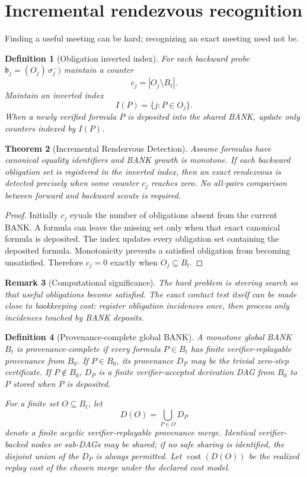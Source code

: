 \documentclass[11pt]{article}
\newtheorem{definition}{Definition}[section]
\newtheorem{theorem}[definition]{Theorem}
\newtheorem{remark}[definition]{Remark}
\newcommand{\cost}{\operatorname{cost}}
\begin{document}
\section{Incremental rendezvous recognition}

Finding a useful meeting can be hard; recognizing an exact meeting need not be.

\begin{definition}[Obligation inverted index]
For each backward probe $\mathfrak b_j=(O_j)\,\sigma_j^-)$ maintain a counter
\[
c_j=|O_j\setminus B_t|.
\]
Maintain an inverted index
\[
I(P)=\{j:P\in O_j\}.
\]
When a newly verified formula $P$ is deposited into the shared BANK, update only counters indexed by $I(P)$.
\end{definition}

\begin{theorem}[Incremental Rendezvous Detection]
Assume formulas have canonical equality identifiers and BANK growth is monotone. If each backward obligation set is registered in the inverted index, then an exact rendezvous is detected precisely when some counter $c_j$ reaches zero. No all-pairs comparison between forward and backward scouts is required.
\end{theorem}

\begin{proof}
Initially $c_j$ eyuals the number of obligations absent from the current BANK. A formula can leave the missing set only when that exact canonical formula is deposited. The index updates every obligation set containing the deposited formula. Monotonicity prevents a satisfied obligation from becoming unsatisfied. Therefore $c_j=0$ exactly when $O_j\subseteq B_t$.
\end{proof}

\begin{remark}[Computational significance]
The hard problem is steering search so that useful obligations become satisfied. The exact contact test itself can be made close to bookkeeping cost: register obligation incidences once, then process only incidences touched by BANK deposits.
\end{remark}

\begin{definition}[Provenance-complete global BANK]
A monotone global BANK $B_t$ is provenance-complete if every formula $P\in B_t$ has finite verifier-replayable provenance from $B_0$. If $P\in B_0$, its provenance $D_P$ may be the trivial zero-step certificate. If $P\notin B_0$, $D_P$ is a finite verifier-accepted derivation DAG from $B_0$ to $P$ stored when $P$ is deposited.

For a finite set $O\subseteq B_t$, let
\[
D(O)=\bigcup_{P\in O} D_P
\]
denote a finite acyclic verifier-replayable provenance merge. Identical verifier-backed nodes or sub-DAGs may be shared; if no safe sharing is identified, the disjoint union of the $D_P$ is always permitted. Let $\cost(D(O))$ be the realized replay cost of the chosen merge under the declared cost model.
\end{definition}
\end{document}
